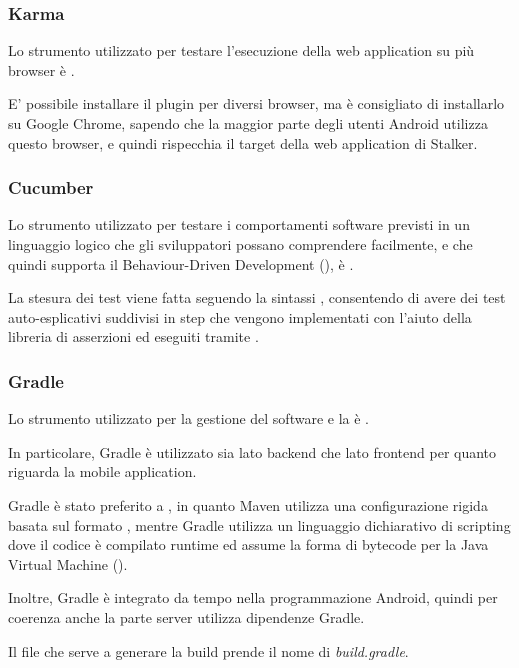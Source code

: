 \documentclass[../../../manuale-manutentore.tex]{subfiles}
\begin{document}

\subsubsection{Karma}%
\label{subs:karma}

Lo strumento utilizzato per testare l'esecuzione della web application su più browser è .

E' possibile installare il plugin per diversi browser, ma è consigliato di installarlo su Google Chrome, sapendo che la maggior parte degli utenti Android utilizza questo browser, e quindi rispecchia il target della web application di Stalker.

\subsubsection{Cucumber}%
\label{subs:cucumber}

Lo strumento utilizzato per testare i comportamenti software previsti in un linguaggio logico che gli sviluppatori possano comprendere facilmente, e che quindi supporta il Behaviour-Driven Development (), è .

La stesura dei test viene fatta seguendo la sintassi , consentendo di avere dei test auto-esplicativi suddivisi in step che vengono implementati con l’aiuto della libreria di asserzioni  ed eseguiti tramite .

\subsubsection{Gradle}%
\label{subs:gradle}

Lo strumento utilizzato per la gestione del software e la  è .

In particolare, Gradle è utilizzato sia lato backend che lato frontend per quanto riguarda la mobile application.

Gradle è stato preferito a , in quanto Maven utilizza una configurazione rigida basata sul formato , mentre Gradle utilizza un linguaggio dichiarativo di scripting  dove il codice è compilato runtime ed assume la forma di bytecode per la Java Virtual Machine ().

Inoltre, Gradle è integrato da tempo nella programmazione Android, quindi per coerenza anche la parte server utilizza dipendenze Gradle.

Il file che serve a generare la build prende il nome di \textit{build.gradle}.
\end{document}
